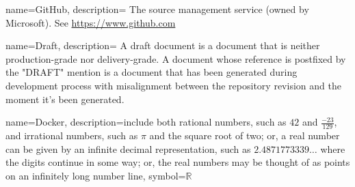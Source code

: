 %
%


{
    name={GitHub},
    description={
        The source management service (owned by Microsoft).
        See \url{https://www.github.com}
    }
}

{
    name={Draft},
    description={
        A draft document is a document that is neither production-grade nor
        delivery-grade. A document whose reference is postfixed by the "\-DRAFT"
        mention is a document that has been generated during development process
        with misalignment between the repository revision and the moment it's been
        generated.
    }
}


{
  name={Docker},
  description={include both rational numbers, such as $42$ and
               $\frac{-23}{129}$, and irrational numbers,
               such as $\pi$ and the square root of two; or,
               a real number can be given by an infinite decimal
               representation, such as $2.4871773339\ldots$ where
               the digits continue in some way; or, the real
               numbers may be thought of as points on an infinitely
               long number line},
  symbol={\ensuremath{\mathbb{R}}}
}
